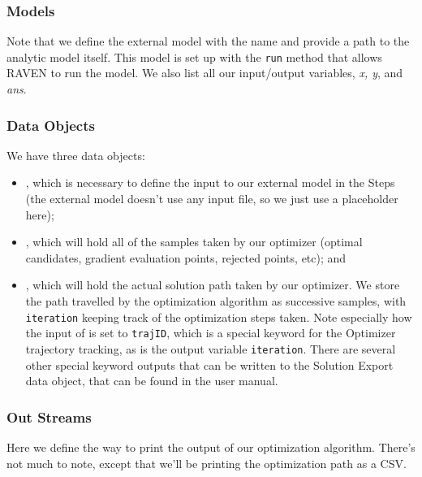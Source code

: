 \subsubsection{Models}
Note that we define the external model with the name  and provide a path to the analytic
model itself.  This model is set up with the \texttt{run} method that allows RAVEN to run the model.  We also
list all our input/output variables, \emph{x, y}, and \emph{ans}.

\subsubsection{Data Objects}
We have three data objects:
\begin{itemize}
\item {}, which is necessary to define the input to our external
model in the Steps (the external model doesn't use any input file, so we just use a placeholder
here);
\item {}, which will hold all of the samples taken by our optimizer (optimal
candidates, gradient evaluation points, rejected points, etc); and
\item {}, which will hold the actual solution path taken by our optimizer.  We store the
path travelled by the optimization algorithm as successive samples, with \texttt{iteration} keeping track of the
optimization steps taken.  Note especially how the input of  is set to \texttt{trajID},
which is a special keyword for the Optimizer trajectory tracking, as is the output variable \texttt{iteration}.
There are several other special keyword outputs that can be written to the Solution Export data object, that
can be found in the user manual.
\end{itemize}

\subsubsection{Out Streams}
Here we define the way to print the output of our optimization algorithm.  There's not much to note, except
that we'll be printing the optimization path as a CSV.

